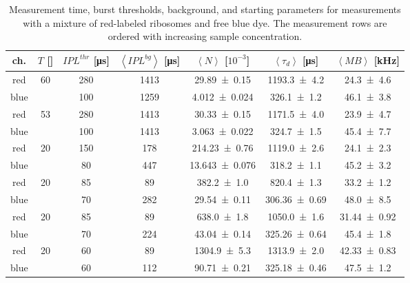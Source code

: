 \vfill
\begin{table}[h!]
	\centering
	\begin{tabular}{c|c|c|c|c|c|c} 
		ch. & $T$ [\si{\min}] & $IPL^{thr}$ [\si{\micro\second}] & $\left\langle IPL^{bg} \right\rangle$ [\si{\micro\second}] & $\left\langle N \right\rangle$ [$10^{-3}$] & $\left\langle \tau_d \right\rangle$ [\si{\micro\second}] & $\left\langle MB \right\rangle$ [\si{\kilo\hertz}] \\
		\hline
		red & \multirow{2}{*}{\num{60}} & \num{280} & \num{1413} & \num{29.89 +- 0.15} & \num{1193.3 +- 4.2} & \num{24.3 +- 4.6}\\
		blue &  & \num{100} & \num{1259} & \num{4.012 +- 0.024} & \num{326.1 +- 1.2} & \num{46.1 +- 3.8} \\
		\hline
		red & \multirow{2}{*}{\num{53}} & \num{280} & \num{1413} & \num{30.33 +- 0.15} & \num{1171.5 +- 4.0} & \num{23.9 +- 4.7}\\
		blue &  & \num{100} & \num{1413} & \num{3.063 +- 0.022} & \num{324.7 +- 1.5} & \num{45.4 +- 7.7} \\
		\hline
		red & \multirow{2}{*}{\num{20}} & \num{150} & \num{178} & \num{214.23 +- 0.76} & \num{1119.0 +- 2.6} & \num{24.1 +- 2.3}\\
		blue &  & \num{80} & \num{447} & \num{13.643 +- 0.076} & \num{318.2 +- 1.1} & \num{45.2 +- 3.2} \\
		\hline
		red & \multirow{2}{*}{\num{20}} & \num{85} & \num{89} & \num{382.2 +- 1.0} & \num{820.4 +- 1.3} & \num{33.2 +- 1.2}\\
		blue &  & \num{70} & \num{282} & \num{29.54 +- 0.11} & \num{306.36 +- 0.69} & \num{48.0 +- 8.5} \\
		\hline
		red & \multirow{2}{*}{\num{20}} & \num{85} & \num{89} & \num{638.0 +- 1.8} & \num{1050.0 +- 1.6} & \num{31.44 +- 0.92}\\
		blue &  & \num{70} & \num{224} & \num{43.04 +- 0.14} & \num{325.26 +- 0.64} & \num{45.4 +- 1.8} \\
		\hline
		red & \multirow{2}{*}{\num{20}} & \num{60} & \num{89} & \num{1304.9 +- 5.3} & \num{1313.9 +- 2.0} & \num{42.33 +- 0.83}\\
		blue &  & \num{60} & \num{112} & \num{90.71 +- 0.21} & \num{325.18 +- 0.46} & \num{47.5 +- 1.2} \\
	\end{tabular}
	\caption[Measurement time, burst thresholds, background, and starting parameters for mixture of red-labeled ribosomes and free blue dye]{Measurement time, burst thresholds, background, and starting parameters for measurements with a mixture of red-labeled ribosomes and free blue dye. The measurement rows are ordered with increasing sample concentration.}
	\label{Table:Measurement_Ribosomes_Alexa488}
\end{table}
\vfill

